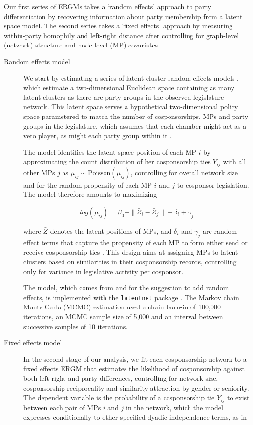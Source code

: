 Our first series of ERGMs takes a `random effects' approach to party differentiation by recovering information about party membership from a latent space model. The second series takes a `fixed effects' approach by measuring within-party homophily and left-right distance after controlling for graph-level (network) structure and node-level (MP) covariates.%

\begin{description}

  \item[Random effects model] %
  We start by estimating a series of latent cluster random effects models  \citep{KrivitskyHandcock2009-SN}, which estimate a two-dimensional Euclidean space containing as many latent clusters as there are party groups in the observed legislature network. This latent space serves a hypothetical two-dimensional policy space parametered to match the number of cosponsorships, MPs and party groups in the legislature, which assumes that each chamber might act as a veto player, as might each party group within it \citep{Tsebelis1999-APSR}.%

  The model identifies the latent space position of each MP $i$ by approximating the count distribution of her cosponsorship ties $Y_{ij}$ with all other MPs $j$ as $\mu_{ij} \sim \textrm{Poisson}(\mu_{ij})$, controlling for overall network size and for the random propensity of each MP $i$ and $j$ to cosponsor legislation. The model therefore amounts to maximizing%

  \[ log(\mu_{ij})=\beta_0 - \|\bar Z_i - \bar Z_j\| + \delta_i + \gamma_j \]%

  where $\bar Z$ denotes the latent positions of MPs, and $\delta_i$ and $\gamma_j$ are random effect terms that capture the propensity of each MP to form either send or receive cosponsorship ties \citep[Equation~4]{KrivitskyHandcock2009-SN}. This design aims at assigning MPs to latent clusters based on similarities in their cosponsorship records, controlling only for variance in legislative activity per cosponsor.%

  The model, which comes from \citet{HoffRaftery2002-JASA} and \citet{Hoff2003-NAP} for the suggestion to add random effects, is implemented with the \texttt{latentnet} package \citep{KrivitskyHandcock2008-JSS}. The Markov chain Monte Carlo (MCMC) estimation used a chain burn-in of 100,000 iterations, an MCMC sample size of 5,000 and an interval between successive samples of 10 iterations.%

  \item[Fixed effects model] %
  \label{sec:ergm}%
  In the second stage of our analysis, we fit each cosponsorship network to a fixed effects ERGM that estimates the likelihood of cosponsorship against both left-right and party differences, controlling for network size, cosponsorship reciprocality and similarity attraction by gender or seniority. The dependent variable is the probability of a cosponsorship tie $Y_{ij}$ to exist between each pair of MPs $i$ and $j$ in the network, which the model expresses conditionally to other specified dyadic independence terms, as in%


\end{description}
